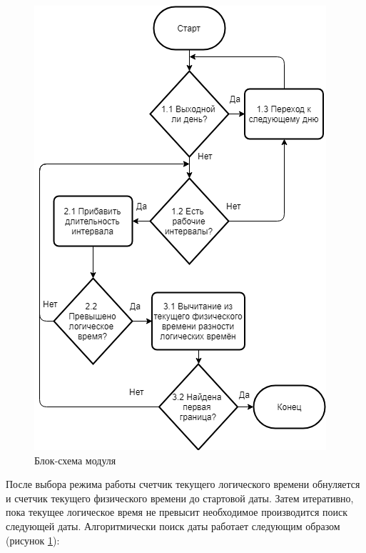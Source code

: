 \begin{figure}[h!]
	\centering
	\includegraphics[width=0.7\linewidth]{pics/scheduleSchema.png}
	\caption{Блок-схема модуля}
	\label{fig:schema}
\end{figure}

\indent После выбора режима работы счетчик текущего логического времени обнуляется и счетчик текущего физического времени до стартовой даты. Затем итеративно, пока текущее логическое время не превысит необходимое производится поиск следующей даты.
Алгоритмически поиск даты работает следующим образом (рисунок \ref{fig:schema}):

